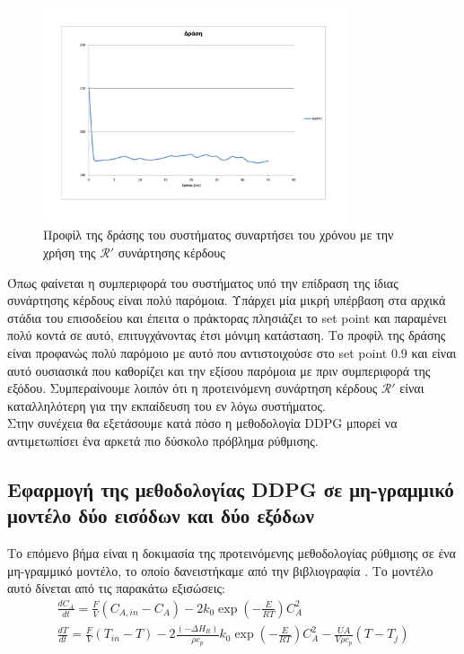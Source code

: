 \documentclass[11pt]{article} %
\numberwithin{equation}{subsection}
\begin{document}
\begin{figure}[H]
    \centering
    \includegraphics[width=0.8\textwidth]{siso_action_3_reward_05.pdf}
    \caption{Προφίλ της δράσης του συστήματος συναρτήσει του χρόνου με την χρήση της $\mathcal{R}'$ συνάρτησης κέρδους}
    \label{fig:siso_action_3_rewards_05}
\end{figure}

Όπως φαίνεται η συμπεριφορά του συστήματος υπό την επίδραση της ίδιας συνάρτησης κέρδους είναι πολύ παρόμοια. Υπάρχει μία μικρή υπέρβαση στα αρχικά στάδια του επισοδείου και έπειτα ο πράκτορας πλησιάζει το set point και παραμένει πολύ κοντά σε αυτό, επιτυγχάνοντας έτσι μόνιμη κατάσταση. Το προφίλ της δράσης είναι προφανώς πολύ παρόμοιο με αυτό που αντιστοιχούσε στο set point 0.9 και είναι αυτό ουσιασικά που καθορίζει και την εξίσου παρόμοια με πριν συμπεριφορά της εξόδου. Συμπεραίνουμε λοιπόν ότι η προτεινόμενη συνάρτηση κέρδους $\mathcal{R}'$ είναι καταλληλότερη για την εκπαίδευση του εν λόγω συστήματος.\\

Στην συνέχεια θα εξετάσουμε κατά πόσο η μεθοδολογία DDPG μπορεί να αντιμετωπίσει ένα αρκετά πιο δύσκολο πρόβλημα ρύθμισης.

\subsection{Εφαρμογή της μεθοδολογίας DDPG σε μη-γραμμικό μοντέλο δύο εισόδων και δύο εξόδων}
Το επόμενο βήμα είναι η δοκιμασία της προτεινόμενης μεθοδολογίας ρύθμισης σε ένα μη-γραμμικό μοντέλο, το οποίο δανειστήκαμε από την βιβλιογραφία \cite{cstr}. Το μοντέλο αυτό δίνεται από τις παρακάτω εξισώσεις:
\begin{equation}
\begin{split}
\frac{dC_{A}}{dt} = \frac{F}{V}(C_{A,in} - C_{A}) - 2k_{0} \exp\left(-\frac{E}{RT}\right)C_{A}^2 \\
\frac{dT}{dt} = \frac{F}{V}(T_{in} - T) - 2\frac{(-ΔΗ_{R})}{ρc_{p}}k_{0} \exp\left(-\frac{E}{RT}\right)C_{A}^2 - \frac{UA}{Vρc_{p}}(T - T_{j})
\end{split}
\end{equation}
\end{document}
